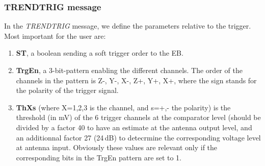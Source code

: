 \subsubsection{TRENDTRIG message}
\label{TRENDTRIG}
In the {\it TRENDTRIG} message, we define the parameters relative to the trigger. Most important for the user are:
\begin{enumerate}[-]
\item{{\bf ST}, a boolean sending a soft trigger order to the EB.}
\item{{\bf TrgEn},  a 3-bit-pattern enabling the different channels. The order of the channels in the pattern is Z-, Y-, X-, Z+, Y+, X+, where the sign stands for the polarity of the trigger signal.}
\item{{\bf ThXs} (where X=1,2,3 is the channel, and s=+,- the polarity) is the threshold (in mV) of the 6 trigger channels at the comparator level (should be divided by a factor 40 to have an estimate at the antenna output level, and an additionnal factor 27 (24\,dB) to detecrmine the corresponding voltage level at antenna input. Obviously these values are relevant only if the corresponding bits in the TrgEn pattern are set to 1.}
\end{enumerate}
